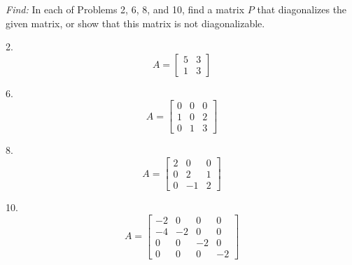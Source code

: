 \documentclass[11pt]{homework}
\begin{document}
\maketitle

\emph{Find:}
\newline
In each of Problems 2, 6, 8, and 10, 
find a matrix $P$ that diagonalizes the given matrix,
or show that this matrix is not diagonalizable.

2.
\begin{equation*}
  A = 
  \begin{bmatrix}
  5 & 3 \\
  1 & 3 
  \end{bmatrix}
\end{equation*}

6.
\begin{equation*}
  A = 
  \begin{bmatrix}
  0 & 0 & 0 \\
  1 & 0 & 2 \\
  0 & 1 & 3 
  \end{bmatrix}
\end{equation*}

8.
\begin{equation*}
  A = 
  \begin{bmatrix}
  2 & 0 & 0 \\
  0 & 2 & 1 \\
  0 & -1 & 2 
  \end{bmatrix}
\end{equation*}

10.
\begin{equation*}
  A = 
  \begin{bmatrix}
  -2 & 0 & 0 &0 \\
  -4 & -2 & 0 &0 \\
  0 & 0 & -2 &0 \\
  0 & 0 & 0 &-2 
  \end{bmatrix}
\end{equation*}
\end{document}
